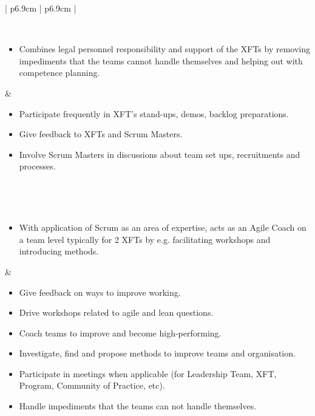 \begin{table}[t]
   \label{table:roledefinitions}
   \begin{tabularx}{\textwidth}{ | p{6.9cm} | p{6.9cm} | }
   
   \hline 
   
   
   \\ \hline 
   
   \begin{itemize}[label={}, leftmargin=*, topsep=0pt, itemsep=0pt, partopsep=0pt]
     \item Combines legal personnel responsibility and support of the \acp{XFT} by removing impediments that the teams cannot handle themselves and helping out with competence planning.  
   \end{itemize} & 
   
   \begin{itemize}[label={}, leftmargin=*, topsep=0pt, itemsep=0pt, partopsep=0pt]
     \item Participate frequently in \ac{XFT}'s stand-ups, demos, backlog preparations.
     \item Give feedback to \acp{XFT} and Scrum Masters.
     \item Involve Scrum Masters in discussions about team set ups, recruitments and processes.
   \end{itemize} 
   
   \\ \hline
   
   
   \\ \hline
   
   \begin{itemize}[label={}, leftmargin=*, topsep=0pt, itemsep=0pt, partopsep=0pt]
     \item With application of Scrum as an area of expertise, acts as an Agile Coach on a team level typically for 2 \acp{XFT} by e.g. facilitating workshops and introducing methods.
   \end{itemize} & 
   
   \begin{itemize}[label={}, leftmargin=*, topsep=0pt, itemsep=0pt, partopsep=0pt]
     \item Give feedback on ways to improve working.
     \item Drive workshops related to agile and lean questions.
     \item Coach teams to improve and become high-performing.
     \item Investigate, find and propose methods to improve teams and organisation.
     \item Participate in meetings when applicable (for Leadership Team, XFT, Program, Community of Practice, etc).
     \item Handle impediments that the teams can not handle themselves.
   \end{itemize} 
   

\end{tabularx}
\end{table}
